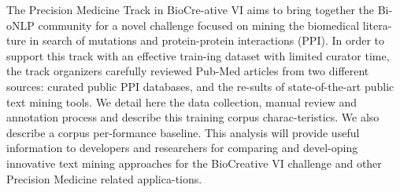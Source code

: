 The Precision Medicine Track in BioCre-ative VI aims to bring together the Bi-oNLP community for a novel challenge focused on mining the biomedical litera-ture in search of mutations and protein-protein interactions (PPI). In order to support this track with an effective train-ing dataset with limited curator time, the track organizers carefully reviewed Pub-Med articles from two different sources: curated public PPI databases, and the re-sults of state-of-the-art public text mining tools. We detail here the data collection, manual review and annotation process and describe this training corpus charac-teristics. We also describe a corpus per-formance baseline. This analysis will provide useful information to developers and researchers for comparing and devel-oping innovative text mining approaches for the BioCreative VI challenge and other Precision Medicine related applica-tions.
